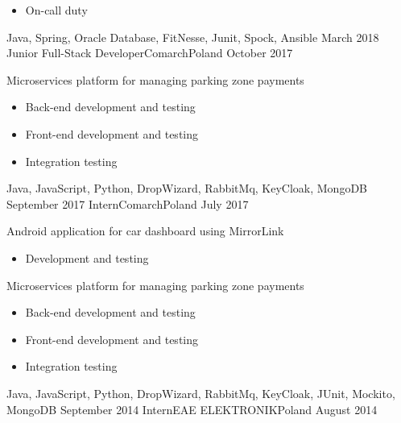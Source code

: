 \begin{experiences}
{\begin{itemize}
                            \item On-call duty
                        \end{itemize}
                    }
                    {Java, Spring, Oracle Database, FitNesse, Junit, Spock, Ansible}
  \emptySeparator
  \experience
    {March 2018}     {Junior Full-Stack Developer}{Comarch}{Poland}
    {October 2017}    {
                        Microservices platform for managing parking zone payments
                        \begin{itemize}
                            \item Back-end development and testing
                            \item Front-end development and testing
                            \item Integration testing
                        \end{itemize}
                    }
                    {Java, JavaScript, Python, DropWizard, RabbitMq, KeyCloak, MongoDB}
  \emptySeparator
  \experience
  {September 2017}       {Intern}{Comarch}{Poland}
  {July 2017}      {
                        Android application for car dashboard using MirrorLink
                        \begin{itemize}
                            \item Development and testing
                        \end{itemize}
                        Microservices platform for managing parking zone payments
                        \begin{itemize}
                            \item Back-end development and testing
                            \item Front-end development and testing
                            \item Integration testing
                        \end{itemize}
                    }
                    {Java, JavaScript, Python, DropWizard, RabbitMq, KeyCloak, JUnit, Mockito, MongoDB}
  \emptySeparator
  \emptyexperience
  {September 2014}      {Intern}{EAE ELEKTRONIK}{Poland}
  {August 2014}      

\end{experiences}
